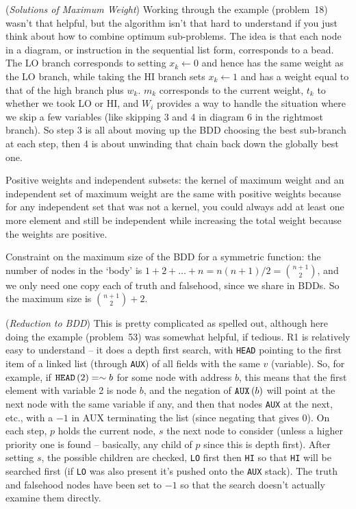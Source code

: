 \vskip 0.08in  ({\it Solutions of 
Maximum Weight})\hfil\break
Working through the example (problem~18) wasn't that helpful, but the
algorithm isn't that hard to understand if you just think about how to
combine optimum sub-problems.  The idea is that each node in a diagram,
or instruction in the sequential list form, corresponds to a bead.
The LO branch corresponds to setting $x_k \gets 0$ and hence
has the same weight as the LO branch, while taking the HI branch
sets $x_k \gets 1$ and has a weight equal to that of the high branch
plus $w_k$.  $m_k$ corresponds to the current weight, $t_k$ to
whether we took LO or HI, and $W_i$ provides a way to handle
the situation where we skip a few variables (like skipping 3 and 4
in diagram 6 in the rightmost branch).  So step 3 is all about moving up
the BDD choosing the best sub-branch at each step, then 4 is about
unwinding that chain back down the globally best one.

\vskip 0.08in \noindent [p 211] Positive weights and independent subsets:
the kernel of maximum weight and an independent set of maximum weight
are the same with positive weights because for any independent set that
was not a kernel, you could always add at least one more element
and still be independent while increasing the total weight because the
weights are positive.

\vskip 0.08in 

\noindent [p 213] Constraint on the maximum size of the BDD for
a symmetric function: the number of nodes in the `body' is
$1 + 2 + \ldots + n = n \left(n + 1\right) / 2 = {n + 1 \choose 2}$,
and we only need one copy each of truth and falsehood, since
we share in BDDs.  So the maximum size is ${n + 1 \choose 2} + 2$.

\vskip 0.08in  ({\it Reduction to BDD})\hfil\break
This is pretty complicated as spelled out, although here doing
the example (problem~53) was somewhat helpful, if tedious.
R1 is relatively easy to understand -- it does a depth first search,
with {\tt HEAD} pointing to the first item of a linked list (through {\tt AUX})
of all fields with the same $v$ (variable).  So, for example,
if ${\tt HEAD}\left(2\right) = \sim b$ for some node with address $b$,
this means that the first element with variable 2 is node $b$,
and the negation of ${\tt AUX}\left(b\right)$ will point at the next node with the same
variable if any, and then that nodes {\tt AUX} at the next, etc., with
a $-1$ in AUX terminating the list (since negating that gives 0).
On each step, $p$ holds the current node, $s$ the next node to consider
(unless a higher priority one is found -- basically, any child of $p$ since
this is depth first).  After setting $s$, the possible children are checked,
{\tt LO} first then {\tt HI} so that {\tt HI} will be searched first (if {\tt LO}
was also present it's pushed onto the {\tt AUX} stack).  The truth and
falsehood nodes have been set to $-1$ so that the search doesn't
actually examine them directly.

